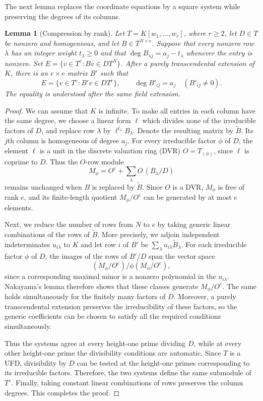 \documentclass[12pt]{amsart}
\numberwithin{equation}{section}
\newtheorem{lemma}[theorem]{Lemma}
\theoremstyle{definition}
\theoremstyle{remark}
\numberwithin{equation}{section}
\begin{document}
The next lemma replaces the coordinate equations by a square system while preserving the degrees of its columns.
\begin{lemma}[Compression by rank]\label{lem:rank-congruence-compression}
Let $T=K[w_1,\ldots,w_r]$, where $r\ge2$, let $D\in T$ be nonzero and homogeneous, and let $B\in T^{N\times e}$. Suppose that every nonzero row $\lambda$ has an integer weight $t_\lambda\ge0$ and that $\deg B_{\lambda j}=a_j-t_\lambda$ whenever the entry is nonzero. Set $E=\{v\in T^e:Bv\in DT^N\}$. After a purely transcendental
extension of $K$, there is an $e\times e$ matrix $B'$ such that
\[
 E=\{v\in T^e:B'v\in DT^e\},\qquad
 \deg B'_{ij}=a_j\quad(B'_{ij}\ne0).
\]
The equality is understood after the same field extension.
\end{lemma}
\begin{proof}
We can assume that $K$ is infinite. To make all entries in each column have the same degree, we choose a linear form $\ell$ which divides none of the irreducible factors of $D$, and replace row $\lambda$ by $\ell^{t_\lambda}B_\lambda$. Denote the resulting
matrix by $\widetilde B$. Its $j$th column is homogeneous of degree $a_j$. For every irreducible factor $\phi$ of $D$, the element
$\ell$ is a unit in the discrete valuation ring (DVR) $O=T_{(\phi)}$, since $\ell$ is coprime to $D$. Thus the $O$-row module
\[
 M_\phi=O^e+\sum_\lambda O\,(B_\lambda/D)
\]
remains unchanged when $B$ is replaced by $\widetilde B$. Since $O$ is a DVR, $M_\phi$ is free of rank $e$, and its finite-length quotient $M_\phi/O^e$ can be generated by at most $e$ elements.

Next, we reduce the number of rows from $N$ to $e$ by taking generic linear combinations of the rows of $\widetilde B$. More precisely, we adjoin independent indeterminates $u_{i\lambda}$ to $K$ and let row $i$ of $B'$ be $\sum_\lambda u_{i\lambda}\widetilde B_\lambda$.
For each irreducible factor $\phi$ of $D$, the images of the rows of $B'/D$ span the vector space
\[
 (M_\phi/O^e)/\phi(M_\phi/O^e),
\]
since a corresponding maximal minor is a nonzero polynomial in the $u_{i\lambda}$. Nakayama's lemma therefore shows that these
classes generate $M_\phi/O^e$. The same holds simultaneously for the finitely many factors of $D$. Moreover, a purely transcendental extension preserves the irreducibility of these factors, so the generic coefficients can be chosen to satisfy all the required conditions simultaneously.

Thus the systems agree at every height-one prime dividing $D$, while at every other height-one prime the divisibility conditions are automatic. Since $T$ is a UFD, divisibility by $D$ can be tested at the height-one primes corresponding to its irreducible factors.
Therefore, the two systems define the same submodule of $T^e$. Finally, taking constant linear combinations of rows preserves the column degrees. This completes the proof.
\end{proof}
\end{document}
